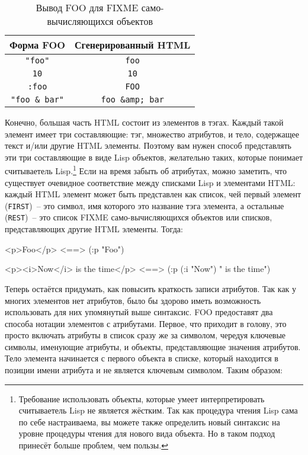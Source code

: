 \begin{table}[tb]
\begin{tabular}{|c|c|}
\hline
  Форма FOO & Сгенерированный HTML \\
\hline
  \lstinline!"foo"! &\lstinline!foo! \\
  \lstinline!10! & \lstinline!10! \\
  \lstinline!:foo! & \lstinline!FOO! \\
  \lstinline!"foo & bar"! & \lstinline!foo &amp; bar!\\
\hline
\end{tabular}
  \caption{Вывод FOO для FIXME само-вычисляющихся объектов} 
  \label{table:30-1}
\end{table}

Конечно, большая часть HTML состоит из элементов в тэгах. Каждый такой элемент имеет три
составляющие: тэг, множество атрибутов, и тело, содержащее текст и/или другие HTML
элементы. Поэтому вам нужен способ представлять эти три составляющие в виде Lisp объектов,
желательно таких, которые понимает считываетель Lisp.\footnote{Требование использовать
  объекты, которые умеет интерпретировать считываетель Lisp не является жёстким. Так как
  процедура чтения Lisp сама по себе настраиваема, вы можете также определить новый синтаксис
  на уровне процедуры чтения для нового вида объекта. Но в таком подход принесёт больше
  проблем, чем пользы.} Если на время забыть об атрибутах, можно заметить, что существует
очевидное соответствие между списками Lisp и элементами HTML: каждый HTML элемент может
быть представлен как список, чей первый элемент (\lstinline{FIRST})~-- это символ, имя которого
это название тэга элемента, а остальные (\lstinline{REST})~-- это список FIXME
само-вычисляющихся объектов или списков, представляющих другие HTML элементы. Тогда:

\begin{myverb}
  <p>Foo</p> <==> (:p "Foo")

  <p><i>Now</i> is the time</p> <==> (:p (:i "Now") " is the time")
\end{myverb}

Теперь остаётся придумать, как повысить краткость записи атрибутов. Так как у многих
элементов нет атрибутов, было бы здорово иметь возможность использовать для них упомянутый
выше синтаксис. FOO предоставят два способа нотации элементов с атрибутами. Первое, что
приходит в голову, это просто включать атрибуты в список сразу же за символом, чередуя
ключевые символы, именующие атрибуты, и объекты, представляющие значения атрибутов. Тело
элемента начинается с первого объекта в списке, который находится в позиции имени атрибута
и не является ключевым символом. Таким образом:

